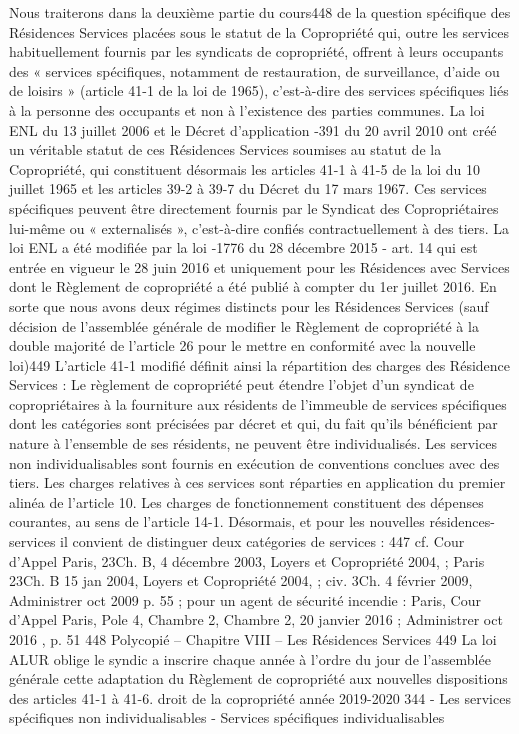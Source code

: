 	Nous traiterons dans la deuxième partie du cours448 de la question spécifique des Résidences Services placées sous le statut de la Copropriété qui, outre les services habituellement fournis par les syndicats de copropriété, offrent à leurs occupants des « services spécifiques, notamment de restauration, de surveillance, d'aide ou de loisirs » (article 41-1 de la loi de 1965), c'est-à-dire des services spécifiques liés à la personne des occupants et non à l’existence des parties communes.
	La loi ENL du 13 juillet 2006 et le Décret d’application -391 du 20 avril 2010 ont créé un véritable statut de ces Résidences Services soumises au statut de la Copropriété, qui constituent désormais les articles 41-1 à 41-5 de la loi du 10 juillet 1965 et les articles 39-2 à 39-7 du Décret du 17 mars 1967.
	Ces services spécifiques peuvent être directement fournis par le Syndicat des Copropriétaires lui-même ou « externalisés », c'est-à-dire confiés contractuellement à des tiers.
	La loi ENL a été modifiée par la loi -1776 du 28 décembre 2015 - art. 14 qui est entrée en vigueur le 28 juin 2016 et uniquement pour les Résidences avec Services dont le Règlement de copropriété a été publié à compter du 1er juillet 2016. En sorte que nous avons deux régimes distincts pour les Résidences Services (sauf décision de l’assemblée générale de modifier le Règlement de copropriété à la double majorité de l’article 26 pour le mettre en conformité avec la nouvelle loi)449
	L’article 41-1 modifié définit ainsi la répartition des charges des Résidence Services : Le règlement de copropriété peut étendre l'objet d'un syndicat de copropriétaires à la fourniture aux résidents de l'immeuble de services spécifiques dont les catégories sont précisées par décret et qui, du fait qu'ils bénéficient par nature à l'ensemble de ses résidents, ne peuvent être individualisés. Les services non individualisables sont fournis en exécution de conventions conclues avec des tiers. Les charges relatives à ces services sont réparties en application du premier alinéa de l'article 10. Les charges de fonctionnement constituent des dépenses courantes, au sens de l'article 14-1.
	Désormais, et pour les nouvelles résidences-services il convient de distinguer deux catégories de services :
	447 cf. Cour d'Appel Paris, 23\degres Ch. B, 4 décembre 2003, Loyers et Copropriété 2004,  ; Paris 23\degres Ch. B 15 jan 2004, Loyers et Copropriété 2004,  ; civ. 3\degres Ch. 4 février 2009, Administrer oct 2009 p. 55 ; pour un agent de sécurité incendie : Paris, Cour d'Appel Paris, Pole 4, Chambre 2, Chambre 2, 20 janvier 2016 ; Administrer oct 2016 , p. 51
	448 Polycopié  – Chapitre VIII – Les Résidences Services
	449 La loi ALUR oblige le syndic a inscrire chaque année à l’ordre du jour de l’assemblée générale cette adaptation du Règlement de copropriété aux nouvelles dispositions des articles 41-1 à 41-6.
	droit de la copropriété année 2019-2020
	344
	- Les services spécifiques non individualisables
	- Services spécifiques individualisables
	
